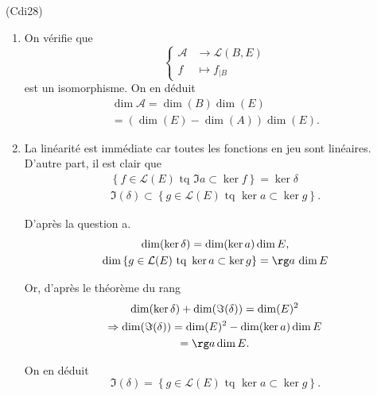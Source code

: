 \begin{tiny}(Cdi28)\end{tiny} 
\begin{enumerate}
 \item On vérifie que 
\[
 \left\lbrace 
 \begin{aligned}
  \mathcal{A} &\rightarrow \mathcal{L}(B,E)\\
  f &\mapsto f_{|B}
 \end{aligned}
\right. 
\]
est un isomorphisme. On en déduit 
\begin{multline*}
\dim \mathcal{A} = \dim(B) \dim(E)\\
= (\dim(E) - \dim(A))\dim(E). 
\end{multline*}


 \item La linéarité est immédiate car toutes les fonctions en jeu sont linéaires. D'autre part, il est clair que
\begin{multline*}
  \left\lbrace f\in \mathcal{L}(E) \text{ tq } \Im a \subset \ker f\right\rbrace = \ker \delta\\
  \Im(\delta) \subset \left\lbrace g\in \mathcal{L}(E) \text{ tq } \ker a \subset \ker g\right\rbrace.  
\end{multline*}

D'après la question a.
\begin{multline*}
 \dim(\ker \delta) = \dim(\ker a)\dim E, \\
 \dim \left\lbrace g\in \mathcal{L}(E) \text{ tq } \ker a \subset \ker g\right\rbrace = \rg a\,\dim E 
\end{multline*}

Or, d'après le théorème du rang 
\begin{multline*}
 \dim(\ker \delta) + \dim (\Im(\delta)) = \dim(E)^2\\
 \Rightarrow 
\dim (\Im(\delta)) =  \dim(E)^2 - \dim(\ker a)\dim E\\
= \rg a \dim E.
\end{multline*}

On en déduit 
\[
 \Im(\delta) = \left\lbrace g\in \mathcal{L}(E) \text{ tq } \ker a \subset \ker g\right\rbrace.
\]

\end{enumerate}

